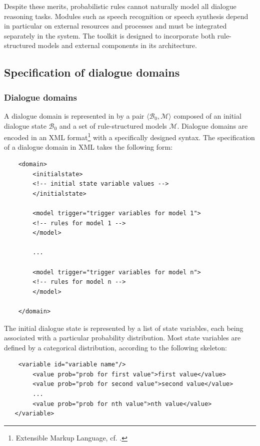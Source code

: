 Despite these merits, probabilistic rules cannot naturally model all dialogue reasoning tasks.  Modules such as speech recognition or speech synthesis depend in particular on external resources and processes and must be integrated separately in the system. The \opendial toolkit is designed to incorporate both rule-structured models and external components in its architecture. 
\subsection{Specification of dialogue domains}
\label{sec:domain-specification}

\subsubsection*{Dialogue domains}

A dialogue domain is represented in \opendial by a pair $\langle \mathcal{B}_0, \mathcal{M} \rangle$ composed of an initial dialogue state $\mathcal{B}_0$ and a set of rule-structured models $\mathcal{M}$. Dialogue domains are encoded in an XML format\footnote{Extensible Markup Language, cf. .} with a specifically designed syntax. The specification of a dialogue domain in XML takes the following form:
\lstset{language=XML}
\begin{lstlisting}
    <domain> 
        <initialstate>
		<!-- initial state variable values -->
        </initialstate>

        <model trigger="trigger variables for model 1">
   		<!-- rules for model 1 -->
     	</model>
     	
     	...
     	
     	<model trigger="trigger variables for model n">
   		<!-- rules for model n -->
     	</model>

    </domain>
\end{lstlisting}\vspace{2mm}

The initial dialogue state is represented by a list of state variables, each being associated with a particular probability distribution.  Most state variables are defined by a categorical distribution, according to the following skeleton:

\vspace{3mm}\begin{lstlisting}
    <variable id="variable name"/>
        <value prob="prob for first value">first value</value>
        <value prob="prob for second value">second value</value>
		...
        <value prob="prob for nth value">nth value</value>
   </variable>  
\end{lstlisting}\vspace{2mm}

